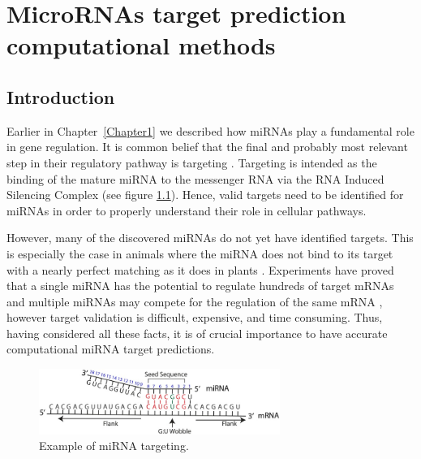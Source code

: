 
\chapter{MicroRNAs target prediction computational methods} %

\label{Chapter2} %



\section{Introduction}
Earlier in Chapter~\ref{Chapter1} we described how miRNAs play a fundamental role in gene regulation. It is common belief that the final and probably most relevant step in their regulatory pathway is targeting \cite{computational_methods}. Targeting is intended as the binding of the mature miRNA to the messenger RNA via the RNA Induced Silencing Complex (see figure \ref{fig:mirna_binding}). Hence, valid targets need to be identified for miRNAs in order to properly understand their role in cellular pathways. 

However, many of the discovered miRNAs do not yet have identified targets. This is especially the case in animals where the miRNA does not bind to its target with a nearly perfect matching as it does in plants \cite{perfect_matching}. Experiments have proved that a single miRNA has the potential to regulate hundreds of target mRNAs and multiple miRNAs may compete for the regulation of the same mRNA \cite{multiple_binds}, however target validation is difficult, expensive, and time consuming. Thus, having considered all these facts, it is of crucial importance to have accurate computational miRNA target predictions.

\begin{figure}[hbt!]
	\centering
	\includegraphics[width=0.7\textwidth]{Figures/seed_match}
	\caption{Example of miRNA targeting.}
	\label{fig:mirna_binding}
\end{figure}


